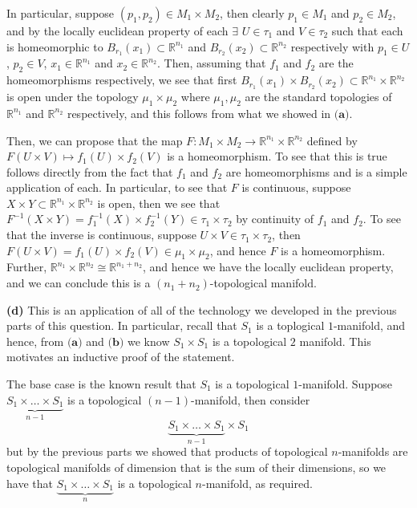 \documentclass[10pt]{article}
\newcommand{\R}{\mathbb{R}}
\begin{document}
In particular, suppose $(p_{1},p_{2})\in M_{1}\times M_{2}$, then clearly $p_{1}\in M_{1}$ and $p_{2}\in M_{2}$, and by the locally euclidean property of each $\exists$ $U\in \tau_{1}$ and $V\in \tau_{2}$ such that each is homeomorphic to $B_{r_{1}}(x_{1}) \subset \R^{n_{1}}$ and $B_{r_{2}}(x_{2}) \subset \R^{n_{2}}$ respectively with $p_{1}\in U$, $p_{2} \in V$, $x_{1} \in \R^{n_{1}}$ and $x_{2}\in \R^{n_{2}}$. Then, assuming that $f_{1}$ and $f_{2}$ are the homeomorphisms respectively, we see that first $B_{r_{1}}(x_{1})\times B_{r_{2}}(x_{2})\subset \R^{n_{1}}\times \R^{n_{2}}$ is open under the topology $\mu_{1}\times\mu_{2}$ where $\mu_{1},\mu_{2}$ are the standard topologies of $\R^{n_{1}}$ and $\R^{n_{2}}$ respectively, and this follows from what we showed in $\textbf{(a)}$.

Then, we can propose that the map $F: M_{1}\times M_{2} \to \R^{n_{1}}\times \R^{n_{2}}$ defined by $F(U\times V) \mapsto f_{1}(U)\times f_{2}(V)$ is a homeomorphism. To see that this is true follows directly from the fact that $f_{1}$ and $f_{2}$ are homeomorphisms and is a simple application of each. In particular, to see that $F$ is continuous, suppose $X\times Y \subset \R^{n_{1}}\times \R^{n_{2}}$ is open, then we see that $F^{-1}(X\times Y) = f_{1}^{-1}(X) \times f_{2}^{-1}(Y) \in \tau_{1}\times \tau_{2}$ by continuity of $f_{1}$ and $f_{2}$. To see that the inverse is continuous, suppose $U\times V \in \tau_{1}\times \tau_{2}$, then $F(U\times V) = f_{1}(U)\times f_{2}(V) \in \mu_{1}\times \mu_{2}$, and hence $F$ is a homeomorphism. Further, $\R^{n_{1}}\times \R^{n_{2}} \cong \R^{n_{1}+n_{2}}$, and hence we have the locally euclidean property, and we can conclude this is a $(n_{1}+n_{2})$-topological manifold.

\textbf{(d)} This is an application of all of the technology we developed in the previous parts of this question. In particular, recall that $S_{1}$ is a toplogical $1$-manifold, and hence, from $\textbf{(a)}$ and $\textbf{(b)}$ we know $S_{1} \times S_{1}$ is a topological $2$ manifold. This motivates an inductive proof of the statement.

The base case is the known result that $S_{1}$ is a topological $1$-manifold. Suppose $\underbrace{S_{1}\times \dots \times S_{1}}_{n-1}$ is a topological $(n-1)$-manifold, then consider
$$\underbrace{S_{1}\times \dots \times S_{1}}_{n-1}\times S_{1}$$
but by the previous parts we showed that products of topological $n$-manifolds are topological manifolds of dimension that is the sum of their dimensions, so we have that $\underbrace{S_{1}\times \dots \times S_{1}}_{n}$ is a topological $n$-manifold, as required.
\end{document}
